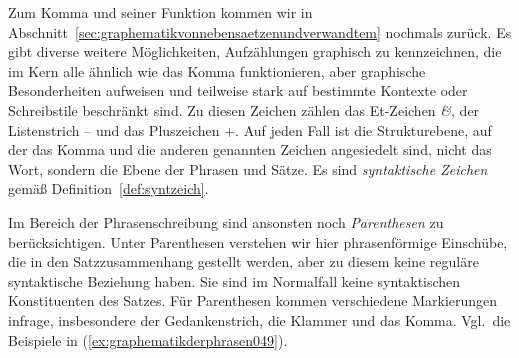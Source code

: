 \begin{exe}
\end{exe}

Zum Komma und seiner Funktion kommen wir in Abschnitt~\ref{sec:graphematikvonnebensaetzenundverwandtem} nochmals zurück.
Es gibt diverse weitere Möglichkeiten, Aufzählungen graphisch zu kennzeichnen, die im Kern alle ähnlich wie das Komma funktionieren, aber graphische Besonderheiten aufweisen und teilweise stark auf bestimmte Kontexte oder Schreibstile beschränkt sind.
Zu diesen Zeichen zählen das Et-Zeichen \textit{\&}, der Listenstrich -- und das Pluszeichen $+$.
Auf jeden Fall ist die Strukturebene, auf der das Komma und die anderen genannten Zeichen angesiedelt sind, nicht das Wort, sondern die Ebene der Phrasen und Sätze.
Es sind \textit{syntaktische Zeichen} gemäß Definition~\ref{def:syntzeich}.


Im Bereich der Phrasenschreibung sind ansonsten noch \textit{Parenthesen} zu berücksichtigen.
Unter Parenthesen verstehen wir hier phrasenförmige Einschübe, die in den Satzzusammenhang gestellt werden, aber zu diesem keine reguläre syntaktische Beziehung haben.
Sie sind im Normalfall keine syntaktischen Konstituenten des Satzes.
Für Parenthesen kommen verschiedene Markierungen infrage, insbesondere der Gedankenstrich, die Klammer und das Komma.
Vgl.\ die Beispiele in (\ref{ex:graphematikderphrasen049}).

\begin{exe}
  \ex\label{ex:graphematikderphrasen049}
  \begin{xlist}
  \end{xlist}
\end{exe}

